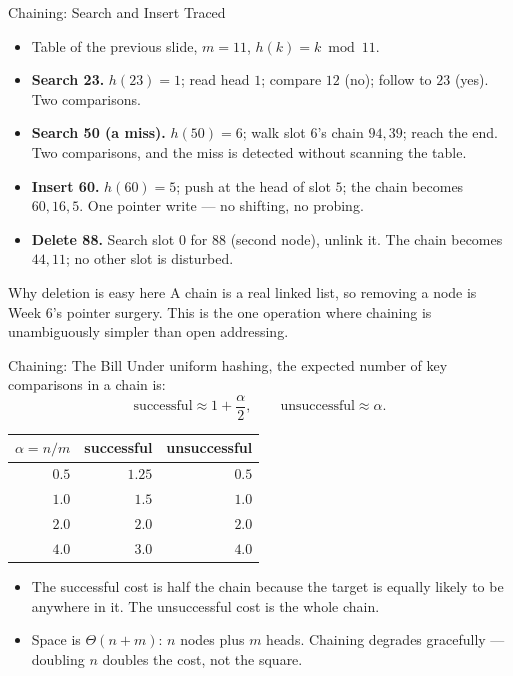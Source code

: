 \documentclass[aspectratio=169]{beamer}
\begin{document}
\begin{frame}{Chaining: Search and Insert Traced}
  \begin{itemize}
    \item Table of the previous slide, $m=11$, $h(k)=k\bmod 11$.
    \item \textbf{Search 23.} $h(23)=1$; read head $1$; compare $12$ (no);
      follow to $23$ (yes). Two comparisons.
    \item \textbf{Search 50 (a miss).} $h(50)=6$; walk slot $6$'s chain
      $94, 39$; reach the end. Two comparisons, and the miss is detected
      without scanning the table.
    \item \textbf{Insert 60.} $h(60)=5$; push at the head of slot $5$; the
      chain becomes $60, 16, 5$. One pointer write --- no shifting, no
      probing.
    \item \textbf{Delete 88.} Search slot $0$ for $88$ (second node), unlink
      it. The chain becomes $44, 11$; no other slot is disturbed.
  \end{itemize}
  \begin{exampleblock}{Why deletion is easy here}
    A chain is a real linked list, so removing a node is Week 6's pointer
    surgery. This is the one operation where chaining is unambiguously
    simpler than open addressing.
  \end{exampleblock}
\end{frame}

\begin{frame}{Chaining: The Bill}
  Under uniform hashing, the expected number of key comparisons in a chain
  is:
  \[
    \text{successful} \approx 1 + \frac{\alpha}{2},
    \qquad
    \text{unsuccessful} \approx \alpha.
  \]
  \begin{center}
  {\footnotesize
  \begin{tabular}{r r r}
    \toprule
    $\alpha = n/m$ & successful & unsuccessful \\
    \midrule
    $0.5$ & $1.25$ & $0.5$ \\
    $1.0$ & $1.5$  & $1.0$ \\
    $2.0$ & $2.0$  & $2.0$ \\
    $4.0$ & $3.0$  & $4.0$ \\
    \bottomrule
  \end{tabular}}
  \end{center}
  \begin{itemize}
    \item The successful cost is half the chain because the target is equally
      likely to be anywhere in it. The unsuccessful cost is the whole chain.
    \item Space is $\Theta(n+m)$: $n$ nodes plus $m$ heads. Chaining degrades
      gracefully --- doubling $n$ doubles the cost, not the square.
  \end{itemize}
\end{frame}
\end{document}
